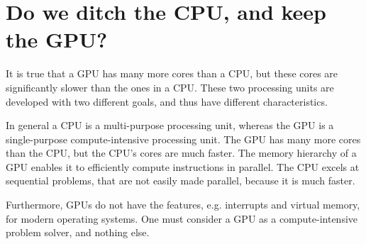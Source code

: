 \section{Do we ditch the CPU, and keep the GPU?}
\label{sec:cpu vs gpu}

It is true that a GPU has many more cores than a CPU, but these cores are significantly slower than the ones in a CPU.
These two processing units are developed with two different goals, and thus have different characteristics.

In general a CPU is a multi-purpose processing unit, whereas the GPU is a single-purpose compute-intensive processing unit.
The GPU has many more cores than the CPU, but the CPU's cores are much faster.
The memory hierarchy of a GPU enables it to efficiently compute instructions in parallel.
The CPU excels at sequential problems, that are not easily made parallel, because it is much faster.

Furthermore, GPUs do not have the features, e.g. interrupts and virtual memory, for modern operating systems.
One must consider a GPU as a compute-intensive problem solver, and nothing else.
